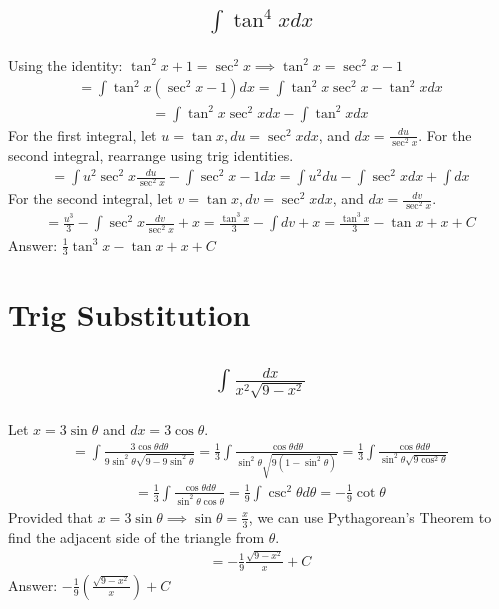 \documentclass{article}
\begin{document}
\subsection{
	\begin{align*}
		\int{\tan^4{x} dx}
	\end{align*}
}
Using the identity: $\tan^2{x} + 1 = \sec^2{x} \implies \tan^2{x} = \sec^2{x} - 1$
\begin{align*}
	= \int{\tan^2{x} \left( \sec^2{x} - 1 \right)dx} = \int{\tan^2{x} \sec^2{x} - \tan^2{x} dx}
\end{align*}
\begin{align*}
	= \int{\tan^2{x} \sec^2{x} dx} - \int{\tan^2{x} dx}
\end{align*}
For the first integral, let $u = \tan{x}, du = \sec^2{x}dx$, and $dx = \frac{du}{\sec^2{x}}$. For the second integral, rearrange using trig identities. 
\begin{align*}
	= \int{u^2 \sec^2{x} \frac{du}{\sec^2{x}}} - \int{\sec^2{x} - 1 dx} = \int{u^2 du} - \int{\sec^2{x}dx} + \int{dx}
\end{align*}
For the second integral, let $v = \tan{x}, dv = \sec^2{x}dx$, and $dx = \frac{dv}{\sec^2{x}}$.
\begin{align*}
	= \frac{u^3}{3} - \int{\sec^2{x} \frac{dv}{\sec^2{x}}} + x = \frac{\tan^3{x}}{3} - \int{dv} + x = \frac{\tan^3{x}}{3} - \tan{x} + x + C
\end{align*}
Answer: $\frac{1}{3} \tan^3{x} - \tan{x} + x + C$

\section{Trig Substitution}
\subsection{
	\begin{align*}
		\int{\frac{dx}{x^2 \sqrt{9 - x^2}}}
	\end{align*}
}
Let $x = 3\sin{\theta}$ and $dx = 3\cos{\theta}$.
\begin{align*}
	= \int{\frac{3\cos{\theta}d\theta}{9\sin^2{\theta}\sqrt{9 - 9\sin^2{\theta}}}} = \frac{1}{3} \int{\frac{\cos{\theta} d\theta}{\sin^2{\theta}\sqrt{9(1 - \sin^2{\theta})}}} = \frac{1}{3} \int{\frac{\cos{\theta} d\theta}{\sin^2{\theta} \sqrt{9\cos^2{\theta}}}}
\end{align*}
\begin{align*}
	= \frac{1}{3} \int{\frac{\cos{\theta}d\theta}{\sin^2{\theta}\cos{\theta}}} = \frac{1}{9} \int{\csc^2{\theta}d\theta} = -\frac{1}{9} \cot{\theta}
\end{align*}
Provided that $x = 3\sin{\theta} \implies \sin{\theta} = \frac{x}{3}$, we can use Pythagorean's Theorem to find the adjacent side of the triangle from $\theta$. 
\begin{align*}
	= -\frac{1}{9} \frac{\sqrt{9 - x^2}}{x} + C
\end{align*}
Answer: $-\frac{1}{9} \left( \frac{\sqrt{9 - x^2}}{x} \right) + C$
\end{document}
